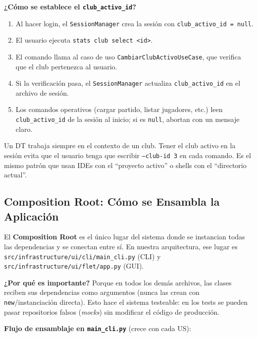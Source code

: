 \documentclass[11pt,a4paper]{article}
\newcommand{\fpath}[1]{\texttt{\small #1}}
\begin{document}
\textbf{¿Cómo se establece el \fpath{club\_activo\_id}?}
\begin{enumerate}[nosep]
  \item Al hacer login, el \fpath{SessionManager} crea la sesión con \fpath{club\_activo\_id = null}.
  \item El usuario ejecuta \fpath{stats club select <id>}.
  \item El comando llama al caso de uso \fpath{CambiarClubActivoUseCase}, que verifica que el club pertenezca al usuario.
  \item Si la verificación pasa, el \fpath{SessionManager} actualiza \fpath{club\_activo\_id} en el archivo de sesión.
  \item Los comandos operativos (cargar partido, listar jugadores, etc.) leen \fpath{club\_activo\_id} de la sesión al inicio; si es \fpath{null}, abortan con un mensaje claro.
\end{enumerate}

\begin{notebox}
Un DT trabaja siempre en el contexto de un club. Tener el club activo en la sesión evita que el usuario tenga que escribir \fpath{--club-id 3} en cada comando. Es el mismo patrón que usan IDEs con el ``proyecto activo'' o shells con el ``directorio actual''.
\end{notebox}

\subsection{Composition Root: Cómo se Ensambla la Aplicación}
\label{sec:composition}

El \textbf{Composition Root} es el único lugar del sistema donde se instancian todas las dependencias y se conectan entre sí. En nuestra arquitectura, ese lugar es \fpath{src/infrastructure/ui/cli/main\_cli.py} (CLI) y \fpath{src/infrastructure/ui/flet/app.py} (GUI).

\textbf{¿Por qué es importante?} Porque en todos los demás archivos, las clases reciben sus dependencias como argumentos (nunca las crean con \fpath{new}/instanciación directa). Esto hace el sistema testeable: en los tests se pueden pasar repositorios falsos (\textit{mocks}) sin modificar el código de producción.

\textbf{Flujo de ensamblaje en \fpath{main\_cli.py}} (crece con cada US):
\end{document}
